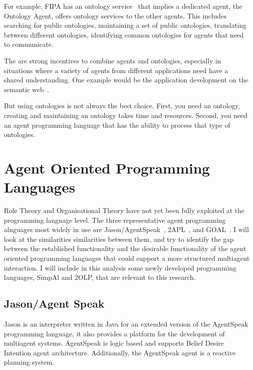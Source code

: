 \documentclass[a4paper,12pt,oneside,fleqn]{book} %
\begin{document}

For example, FIPA has an ontology service~\cite{web:fipaOntol} that implies
a dedicated agent, the Ontology Agent, offers ontology services to the
other agents.  This includes searching for public ontologies, maintaining a
set of public ontologies, translating between different ontologies,
identifying common ontologies for agents that need to communicate.

The are strong incentives to combine agents and ontologies, especially in
situations where a variety of agents from different applications need have
a shared understanding. One example would be the application development on
the semantic web~\cite{DBLP:conf/dalt/MoreiraVBH05}.


But using ontologies is not always the best choice. First, you need an ontology,
creating and maintaining an ontology takes time and resources. Second, you
need an agent programming language that has the ability to process
that type of ontologies. 


\chapter{Agent Oriented Programming Languages} %
Role Theory and Organisational Theory have not yet been fully exploited at
the programming language level. The three representative agent programming
alnguages most widely in use are
Jason/AgentSpeak~\cite{DBLP:books/sp/map2005/BordiniHV05},
2APL~\cite{DBLP:journals/aamas/Dastani08}, and
GOAL~\cite{DBLP:journals/corr/cs-AI-0207008}. I will look at
the similarities similarities between them, and try to identify the gap
between the established functionality and the desirable functionality of
the agent oriented programming languages that could support a more
structured multiagent interaction. I will include in this analysis some
newly developed programming languages, SimpAl and 2OLP, that are relevant
to this research.

\section{Jason/Agent Speak} %
Jason is an interpreter written in Java for an extended version of the
AgentSpeak programming language, it also provides a platform for the
development of multiagent systems. AgentSpeak is logic based and supports
Belief Desire Intention agent architecture. Additionally, the AgentSpeak
agent is a reactive planning system.
\end{document}
